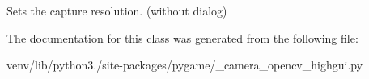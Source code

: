 \begin{DoxyVerb}Sets the capture resolution. (without dialog)
\end{DoxyVerb}
 

The documentation for this class was generated from the following file\+:\begin{DoxyCompactItemize}
\item 
venv/lib/python3./site-\/packages/pygame/\+\_\+camera\+\_\+opencv\+\_\+highgui.\+py\end{DoxyCompactItemize}
